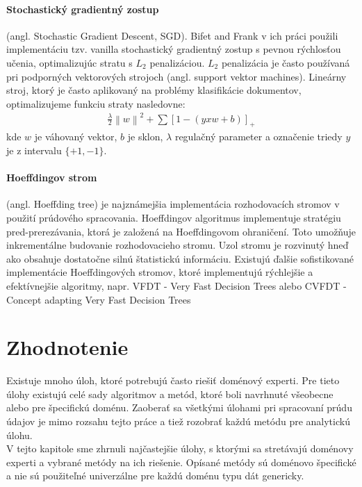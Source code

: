 \paragraph{Stochastický gradientný zostup} (angl. Stochastic Gradient Descent, SGD). Bifet and Frank v ich práci použili implementáciu tzv. vanilla stochastický gradientný zostup s pevnou rýchlosťou učenia, optimalizujúc stratu s $L_2$ penalizáciou. $L_2$ penalizácia je často používaná pri podporných vektorových strojoch (angl. support vektor machines). Lineárny stroj, ktorý je často aplikovaný na problémy klasifikácie dokumentov, optimalizujeme funkciu straty nasledovne:
\begin{align*}
\frac{\lambda }{2}\left \| w \right \|^{2}+\sum [1-(yxw + b)]_{+}
\end{align*}
kde $w$ je váhovaný vektor, $b$ je sklon, $\lambda$ regulačný parameter a označenie triedy $y$ je z intervalu $\{+1, -1\}$.

\paragraph{Hoeffdingov strom} (angl. Hoeffding tree) je najznámejšia implementácia rozhodovacích stromov v použití prúdového spracovania. Hoeffdingov algoritmus implementuje stratégiu pred-prerezávania, ktorá je založená na Hoeffdingovom ohraničení. Toto umožňuje inkrementálne budovanie rozhodovacieho stromu. Uzol stromu je rozvinutý hneď ako obsahuje dostatočne silnú štatistickú informáciu. Existujú ďalšie sofistikované implementácie Hoeffdingových stromov, ktoré implementujú rýchlejšie a efektívnejšie algoritmy, napr. VFDT - Very Fast Decision Trees \citep{domingos2000mining} alebo CVFDT - Concept adapting Very Fast Decision Trees \citep{hulten2001mining}



\section{Zhodnotenie}
Existuje mnoho úloh, ktoré potrebujú často riešiť doménový experti. Pre tieto úlohy existujú celé sady algoritmov a metód, ktoré boli navrhnuté všeobecne alebo pre špecifickú doménu. Zaoberať sa všetkými úlohami pri spracovaní prúdu údajov je mimo rozsahu tejto práce a tiež rozobrať každú metódu pre analytickú úlohu. \\
V tejto kapitole sme zhrnuli najčastejšie úlohy, s ktorými sa stretávajú doménovy experti a vybrané metódy na ich riešenie. Opísané metódy sú doménovo špecifické a nie sú použiteľné univerzálne pre každú doménu typu dát genericky.